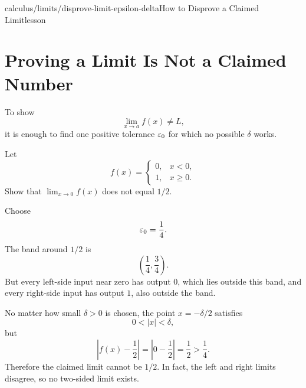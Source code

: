 \begin{webpage}{calculus/limits/disprove-limit-epsilon-delta}{How to Disprove a Claimed Limit}{lesson}
\section{Proving a Limit Is Not a Claimed Number}

To show
\[
  \lim_{x\to a}f(x)\ne L,
\]
it is enough to find one positive tolerance \(\varepsilon_0\) for which no possible \(\delta\) works.

\begin{bgexample}[title={A jump fails the formal definition}]
Let
\[
  f(x)=
  \begin{cases}
    0,&x<0,\\
    1,&x\ge0.
  \end{cases}
\]
Show that \(\lim_{x\to0}f(x)\) does not equal \(1/2\).

\begin{bgsolution}
Choose
\[
  \varepsilon_0=\frac14.
\]
The band around \(1/2\) is
\[
  \left(\frac14,\frac34\right).
\]
But every left-side input near zero has output \(0\), which lies outside this band, and every right-side input has output \(1\), also outside the band.

No matter how small \(\delta>0\) is chosen, the point \(x=-\delta/2\) satisfies
\[
  0<|x|<\delta,
\]
but
\[
  \left|f(x)-\frac12\right|
  =\left|0-\frac12\right|
  =\frac12
  >\frac14.
\]
Therefore the claimed limit cannot be \(1/2\). In fact, the left and right limits disagree, so no two-sided limit exists.
\end{bgsolution}
\end{bgexample}
\end{webpage}

